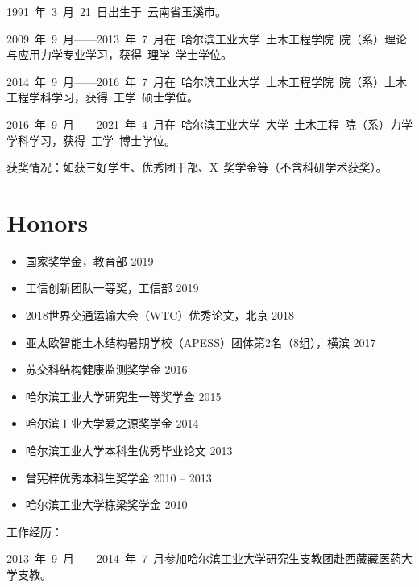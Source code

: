 
\begin{resume}
1991~年~3~月~21~日出生于~云南省玉溪市。

2009~年~9~月------2013~年~7~月在~哈尔滨工业大学~土木工程学院~院（系）理论与应用力学专业学习，获得~理学~学士学位。

2014~年~9~月------2016~年~7~月在~哈尔滨工业大学~土木工程学院~院（系）土木工程学科学习，获得~工学~硕士学位。

2016~年~9~月------2021~年~4~月在~哈尔滨工业大学~大学~土木工程~院（系）力学学科学习，获得~工学~博士学位。

获奖情况：如获三好学生、优秀团干部、X~奖学金等（不含科研学术获奖）。

\section{\large Honors}

\vspace{17pt}

\begin{itemize}[label={-}] \itemsep -1pt %
\item 国家奖学金，教育部 \hfill 2019
\item 工信创新团队一等奖，工信部 \hfill 2019
\item 2018世界交通运输大会（WTC）优秀论文，北京 \hfill 2018
\item 亚太欧智能土木结构暑期学校（APESS）团体第2名（8组），横滨 \hfill 2017
\item 苏交科结构健康监测奖学金 \hfill 2016
\item 哈尔滨工业大学研究生一等奖学金 \hfill 2015
\item 哈尔滨工业大学爱之源奖学金 \hfill 2014
\item 哈尔滨工业大学本科生优秀毕业论文 \hfill 2013
\item 曾宪梓优秀本科生奖学金 \hfill 2010 -- 2013
\item 哈尔滨工业大学栋梁奖学金 \hfill 2010

\end{itemize}

工作经历：

2013~年~9~月------2014~年~7~月参加哈尔滨工业大学研究生支教团赴西藏藏医药大学支教。


\end{resume}
